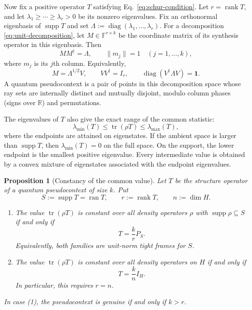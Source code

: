 \documentclass[
  twocolumn,
  aps,
  pra,
  floatfix,
  amsmath,amssymb,
  longbibliography
]{revtex4-2}
\newtheorem{proposition}[theorem]{Proposition}
\theoremstyle{definition}
\theoremstyle{remark}
\newcommand{\R}{\mathbb R}
\newcommand{\F}{\mathbb F}
\newcommand{\supp}{\operatorname{supp}}
\newcommand{\ran}{\operatorname{ran}}
\newcommand{\diag}{\operatorname{diag}}
\newcommand{\Tr}{\operatorname{tr}}
\newcommand{\1}{\mathbf 1}
\begin{document}
Now fix a positive operator $T$ satisfying Eq.~\eqref{eq:schur-condition}.
Let $r=\operatorname{rank}T$, and let
$\lambda_1\ge\cdots\ge\lambda_r>0$ be its nonzero eigenvalues.  Fix an
orthonormal eigenbasis of $\operatorname{supp}T$ and set
$\Lambda:=\diag(\lambda_1,\ldots,\lambda_r)$.  For a decomposition
\eqref{eq:unit-decomposition}, let $M\in\F^{r\times k}$ be the coordinate
matrix of its synthesis operator in this eigenbasis.  Then
\begin{equation}
 MM^\dagger=\Lambda,\qquad \|m_j\|=1\quad(j=1,\ldots,k),
 \label{eq:canonical-fiber}
\end{equation}
where $m_j$ is its $j$th column.  Equivalently,
\begin{equation}
 M=\Lambda^{1/2}V,\qquad VV^\dagger=I_r,\qquad
 \diag(V^\dagger\Lambda V)=\1.
 \label{eq:stiefel-fiber}
\end{equation}
A quantum pseudocontext is a pair of points in this decomposition space whose
ray sets are internally distinct and mutually disjoint, modulo column phases
(signs over $\R$) and permutations.

The eigenvalues of $T$ also give the exact range of the common statistic:
\begin{equation}
 \lambda_{\min}(T)\le \Tr(\rho T)\le\lambda_{\max}(T),
 \label{eq:rayleigh}
\end{equation}
where the endpoints are attained on eigenstates.  If the ambient space is
larger than $\supp T$, then $\lambda_{\min}(T)=0$ on the full space.  On the
support, the lower endpoint is the smallest positive eigenvalue.  Every
intermediate value is obtained by a convex mixture of eigenstates associated
with the endpoint eigenvalues.

\begin{proposition}[Constancy of the common value]
\label{prop:constancy}
Let $T$ be the structure operator of a quantum pseudocontext of size $k$.
Put
\[
 S:=\supp T=\ran T,\qquad r:=\operatorname{rank}T,\qquad n:=\dim H.
\]
\begin{enumerate}
 \item The value $\Tr(\rho T)$ is constant over all density operators $\rho$
 with $\supp\rho\subseteq S$ if and only if
 \[
  T=\frac{k}{r}P_S.
 \]
 Equivalently, both families are unit-norm tight frames for $S$.
 \item The value $\Tr(\rho T)$ is constant over all density operators on $H$
 if and only if
 \[
  T=\frac{k}{n}I_H.
 \]
 In particular, this requires $r=n$.
\end{enumerate}
In case (1), the pseudocontext is genuine if and only if $k>r$.
\end{proposition}
\end{document}
